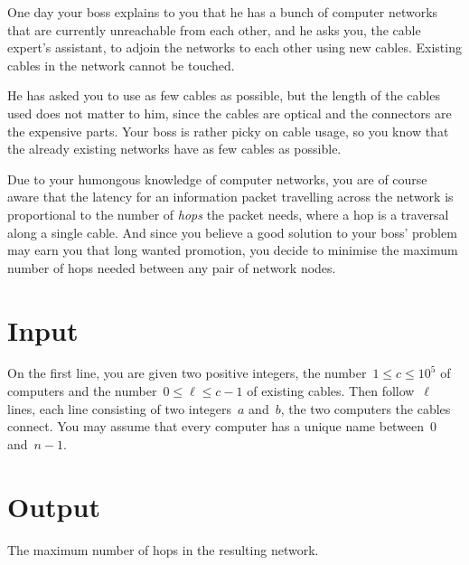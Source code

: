 
One day your boss explains to you that he has a bunch of computer networks
that are currently unreachable from each other, and he asks you,
the cable expert's assistant, to adjoin the networks to each other using new cables.
Existing cables in the network cannot be touched.

He has asked you to use as few cables as possible, but the length of
the cables used does not matter to him, since the cables are optical
and the connectors are the expensive parts. Your boss is rather picky
on cable usage, so you know that the already existing networks have as
few cables as possible.%

Due to your humongous knowledge of computer networks, you are of
course aware that the latency for an information packet travelling across
the network is proportional to the number of \emph{hops} the
packet needs, where a hop is a traversal along a single cable.
And since you believe a good solution to your boss' problem
may earn you that long wanted promotion, you decide to
minimise the maximum number of hops needed between any pair of
network nodes.

\section*{Input}
On the first line, you are given two positive integers, the number~$1 \leq c
\leq 10^5$
of computers and the number~$0 \leq \ell \leq c-1$ of existing cables. Then
follow~$\ell$ lines, each line consisting of two integers~$a$ and~$b$,
the two computers the cables connect. You may assume that every
computer has a unique name between~$0$ and~$n-1$.

\section*{Output}
The maximum number of hops in the resulting network.
